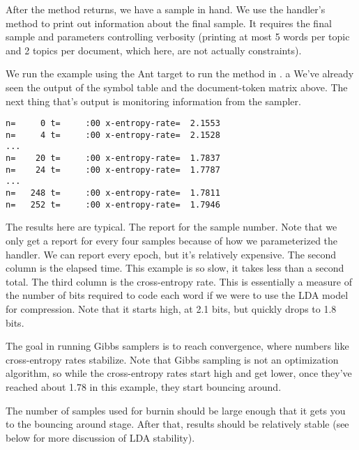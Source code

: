 After the method returns, we have a sample in hand.  We use the
handler's  method to print out information
about the final sample.  It requires the final sample and parameters
controlling verbosity (printing at most 5 words per topic and 2 topics
per document, which here, are not actually constraints).
%

We run the example using the Ant target  to
run the  method in .  
a
%
%
We've already seen the output of the symbol table and the 
document-token matrix above.  The next thing that's output
is monitoring information from the sampler.
%
\begin{verbatim}
n=     0 t=     :00 x-entropy-rate=  2.1553
n=     4 t=     :00 x-entropy-rate=  2.1528
...
n=    20 t=     :00 x-entropy-rate=  1.7837
n=    24 t=     :00 x-entropy-rate=  1.7787
...
n=   248 t=     :00 x-entropy-rate=  1.7811
n=   252 t=     :00 x-entropy-rate=  1.7946
\end{verbatim}
%
The results here are typical.  The report for the sample number.  Note
that we only get a report for every four samples because of how we
parameterized the handler.  We can report every epoch, but it's
relatively expensive.  The second column is the elapsed time.  This
example is so slow, it takes less than a second total.  The third
column is the cross-entropy rate.  This is essentially a measure of
the number of bits required to code each word if we were to use the
LDA model for compression.  Note that it starts high, at 2.1 bits, but
quickly drops to 1.8 bits.  

The goal in running Gibbs samplers is to reach convergence, where
numbers like cross-entropy rates stabilize.  Note that Gibbs sampling
is not an optimization algorithm, so while the cross-entropy rates
start high and get lower, once they've reached about 1.78 in this
example, they start bouncing around.  

The number of samples used for burnin should be large enough that it
gets you to the bouncing around stage.  After that, results should be
relatively stable (see below for more discussion of LDA stability).

